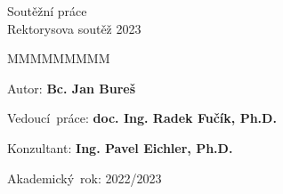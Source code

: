 {%
\vspace{2cm}

{\large{}Soutěžní práce\\Rektorysova soutěž 2023}{\large\par}
\vfill{}

\begin{lyxlist}{MMMMMMMMM}
	\begin{singlespace}
		\item [{Autor:}] \textbf{Bc. Jan Bureš}
		\item [{Vedoucí~práce:}] \textbf{doc. Ing. Radek Fučík, Ph.D.}
		\item [{Konzultant:}] \textbf{Ing. Pavel Eichler, Ph.D.}
		\item [{Akademický~rok:}] 2022/2023
	\end{singlespace}
\end{lyxlist}
\newpage{}
}

